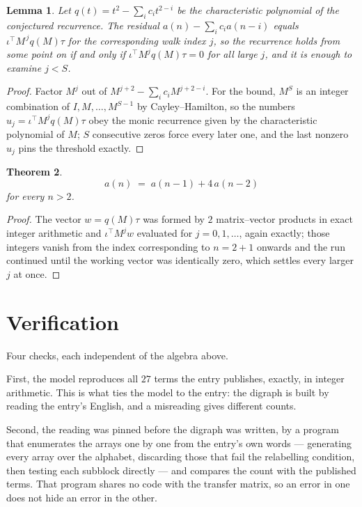 \documentclass[11pt,a4paper]{article}
\theoremstyle{plain}
\newtheorem{theorem}{Theorem}
\newtheorem{lemma}[theorem]{Lemma}
\theoremstyle{definition}
\begin{document}
\begin{lemma}\label{lem:crit}
Let $q(t)=t^{2}-\sum_i c_it^{2-i}$ be the characteristic polynomial of the
conjectured recurrence. The residual $a(n)-\sum_ic_ia(n-i)$ equals
$\iota^{\!\top}M^{\,j}q(M)\tau$ for the corresponding walk index $j$, so the recurrence
holds from some point on if and only if $\iota^{\!\top}M^{j}q(M)\tau=0$ for all large $j$,
and it is enough to examine $j<S$.
\end{lemma}

\begin{proof}
Factor $M^{j}$ out of $M^{j+2}-\sum_ic_iM^{j+2-i}$. For the bound, $M^{S}$
is an integer combination of $I,M,\dots,M^{S-1}$ by Cayley--Hamilton, so the numbers
$u_j=\iota^{\!\top}M^{j}q(M)\tau$ obey the monic recurrence given by the characteristic
polynomial of $M$; $S$ consecutive zeros force every later one, and the last nonzero $u_j$
pins the threshold exactly.
\end{proof}

\begin{theorem}
\[
a(n)\;=\;a(n-1) + 4\,a(n-2)
\]
for every $n>2$.
\end{theorem}

\begin{proof}
The vector $w=q(M)\tau$ was formed by $2$ matrix--vector products in exact integer
arithmetic and $\iota^{\!\top}M^{j}w$ evaluated for $j=0,1,\dots$, again exactly; those
integers vanish from the index corresponding to $n=2+1$ onwards and the run continued
until the working vector was identically zero, which settles every larger $j$ at once.
\end{proof}

\section{Verification}

Four checks, each independent of the algebra above.

First, the model reproduces all $27$ terms the entry publishes, exactly, in integer
arithmetic. This is what ties the model to the entry: the digraph is built by reading the
entry's English, and a misreading gives different counts.

Second, the reading was pinned before the digraph was written, by a program that enumerates
the arrays one by one from the entry's own words --- generating every array over the
alphabet, discarding those that fail the relabelling condition, then testing each subblock
directly --- and compares the count with the published terms. That program shares no code
with the transfer matrix, so an error in one does not hide an error in the other.
\end{document}

